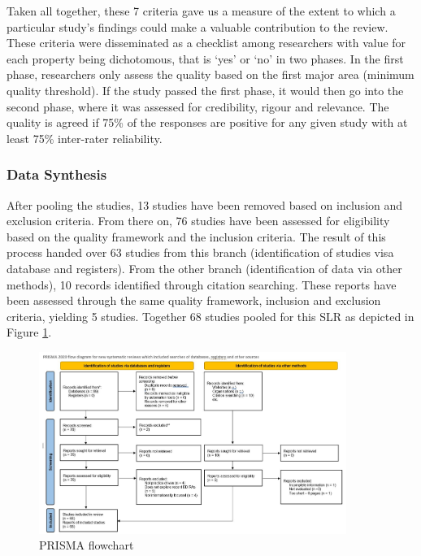 \documentclass[review]{elsarticle}
\begin{document}
Taken all together, these 7 criteria gave us a measure of the extent to which a particular study's findings could make a valuable contribution to the review. These criteria were disseminated as a checklist among researchers with value for each property being dichotomous, that is `yes’ or `no’ in two
phases. In the first phase, researchers only assess the quality
based on the first major area (minimum quality threshold).
If the study passed the first phase, it would then go into the
second phase, where it was assessed for credibility, rigour
and relevance. The quality is agreed if 75\% of the responses
are positive for any given study with at least 75\% inter-rater
reliability.


\subsubsection{Data Synthesis}

After pooling the studies, 13 studies have been removed based on inclusion  and exclusion criteria. From there on, 76 studies have been assessed for eligibility based on the quality framework and the inclusion criteria. The result of this process handed over 63 studies from this branch (identification of studies visa database and registers). From the other branch (identification of data via other methods), 10 records identified through citation searching. These reports have been assessed through the same quality framework, inclusion and exclusion criteria, yielding 5 studies. Together 68 studies pooled for this SLR as depicted in Figure \ref{fig:PRISMA}.

\begin{figure}[h!]
    \centering
    \includegraphics[width=10cm]{PRISMA.JPG}
    \caption{PRISMA flowchart}
    \label{fig:PRISMA}
\end{figure}
\end{document}
